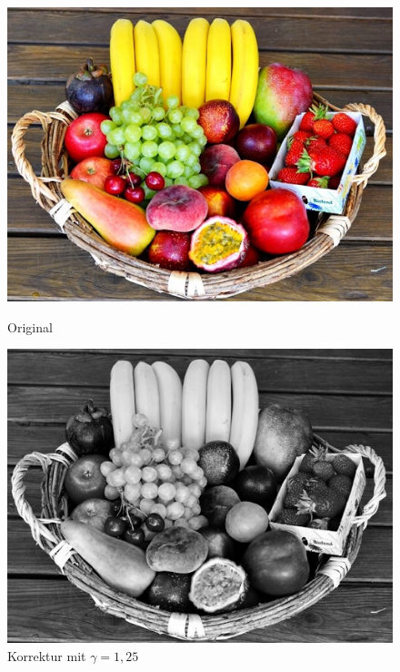 \documentclass[course=erap]{aspdoc}
\begin{document}
	\begin{figure}[h]
		\begin{minipage}{0.49\linewidth}
			\centering
			\includegraphics[scale=1.2]{Images/fruit_basket_original.png}
			\caption{Original}
			\label{Obstkorb}
		\end{minipage}
		\centering
		\begin{minipage}{0.49\linewidth}
			\centering
			\includegraphics[scale=1.2]{Images/fruit_basket_gamma_1,25.png}
			\caption{Korrektur mit $\gamma = 1,25$}
			\label{ObstkorbGamma1_25}
		\end{minipage}
		\begin{minipage}{0.49\linewidth}
			\centering

\end{minipage}
\end{figure}
\end{document}
